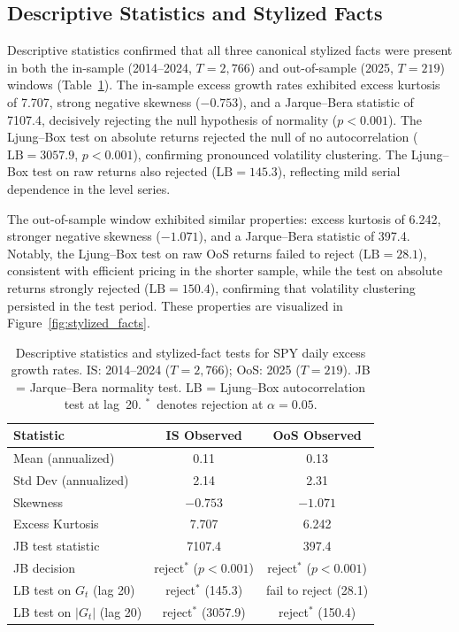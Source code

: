 \subsection{Descriptive Statistics and Stylized Facts}
\label{sec:descriptive}

Descriptive statistics confirmed that all three canonical stylized facts were present in both the in-sample (2014--2024, $T = 2{,}766$) and out-of-sample (2025, $T = 219$) windows (Table~\ref{tab:descriptive}).
The in-sample excess growth rates exhibited excess kurtosis of 7.707, strong negative skewness ($-0.753$), and a Jarque--Bera statistic of 7107.4, decisively rejecting the null hypothesis of normality ($p < 0.001$).
The Ljung--Box test on absolute returns rejected the null of no autocorrelation ($\text{LB} = 3057.9$, $p < 0.001$), confirming pronounced volatility clustering.
The Ljung--Box test on raw returns also rejected ($\text{LB} = 145.3$), reflecting mild serial dependence in the level series.

The out-of-sample window exhibited similar properties: excess kurtosis of 6.242, stronger negative skewness ($-1.071$), and a Jarque--Bera statistic of 397.4.
Notably, the Ljung--Box test on raw OoS returns failed to reject ($\text{LB} = 28.1$), consistent with efficient pricing in the shorter sample, while the test on absolute returns strongly rejected ($\text{LB} = 150.4$), confirming that volatility clustering persisted in the test period.
These properties are visualized in Figure~\ref{fig:stylized_facts}.

\begin{table}[t]
\centering
\caption{Descriptive statistics and stylized-fact tests for SPY daily excess growth rates. IS: 2014--2024 ($T = 2{,}766$); OoS: 2025 ($T = 219$). JB = Jarque--Bera normality test. LB = Ljung--Box autocorrelation test at lag~20. $^*$~denotes rejection at $\alpha = 0.05$.}
\label{tab:descriptive}
\begin{tabular}{lcc}
\toprule
Statistic & IS Observed & OoS Observed \\
\midrule
Mean (annualized) & 0.11 & 0.13 \\
Std Dev (annualized) & 2.14 & 2.31 \\
Skewness & $-0.753$ & $-1.071$ \\
Excess Kurtosis & 7.707 & 6.242 \\
JB test statistic & 7107.4 & 397.4 \\
JB decision & reject$^*$ ($p < 0.001$) & reject$^*$ ($p < 0.001$) \\
LB test on $G_t$ (lag 20) & reject$^*$ (145.3) & fail to reject (28.1) \\
LB test on $|G_t|$ (lag 20) & reject$^*$ (3057.9) & reject$^*$ (150.4) \\
\bottomrule
\end{tabular}
\end{table}

